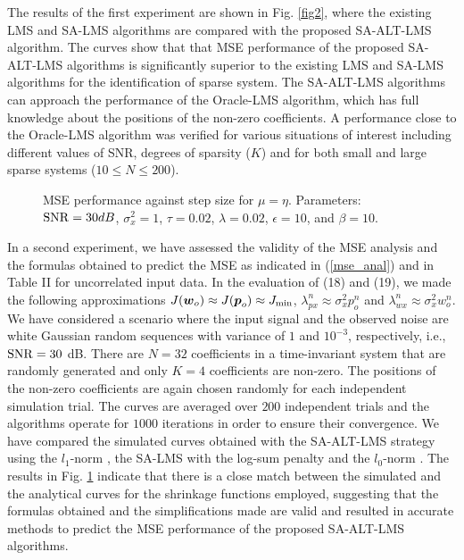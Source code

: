 \documentclass[10pt,onecolumn]{IEEEtran}
\begin{document}
The results of the first experiment are shown in Fig. \ref{fig2},
where the existing LMS and SA-LMS algorithms are compared with the
proposed SA-ALT-LMS algorithm. The curves show that that MSE
performance of the proposed SA-ALT-LMS algorithms is significantly
superior to the existing LMS and SA-LMS algorithms for the
identification of sparse system. The SA-ALT-LMS algorithms can
approach the performance of the Oracle-LMS algorithm, which has full
knowledge about the positions of the non-zero coefficients. A
performance close to the Oracle-LMS algorithm was verified for
various situations of interest including different values of SNR,
degrees of sparsity ($K$) and for both small and large sparse
systems ($10 \leq N \leq 200$).

\begin{figure}[!htb]
\begin{center}
\def\epsfsize#1#2{0.875\columnwidth}
 \vspace{-1.35em}\caption{MSE performance against
step size for $\mu=\eta$. Parameters: ${\rm SNR}=30 dB$,
$\sigma_x^2=1$, $\tau = 0.02$, $\lambda=0.02$, $\epsilon = 10$, and
$\beta = 10$. }\label{fig3}
\end{center}
\end{figure}

In a second experiment, we have assessed the validity of the MSE
analysis and the formulas obtained to predict the MSE as indicated
in (\ref{mse_anal}) and in Table II for uncorrelated input data. In
the evaluation of (18) and (19), we made the following
approximations $J({\boldsymbol w}_o) \approx J({\boldsymbol p}_o)
\approx J_{\rm min}$, $\lambda_{px}^n \approx \sigma_x^2 p_o^n$ and
$\lambda_{wx}^n \approx \sigma_x^2 w_o^n$. We have considered a
scenario where the input signal and the observed noise are white
Gaussian random sequences with variance of $1$ and $10^{-3}$,
respectively, i.e., ${\rm SNR} = 30$ dB. There are $N=32$
coefficients in a time-invariant system that are randomly generated
and only $K=4$ coefficients are non-zero. The positions of the
non-zero coefficients are again chosen randomly for each independent
simulation trial. The curves are averaged over $200$ independent
trials and the algorithms operate for $1000$ iterations in order to
ensure their convergence. We have compared the simulated curves
obtained with the SA-ALT-LMS strategy using the $l_1$-norm
\cite{chen}, {the SA-LMS with the log-sum penalty
\cite{chen,eksioglu,candes} and the $l_0$-norm \cite{gu,eksioglu2}.}
The results in Fig. \ref{fig3} indicate that there is a close match
between the simulated and the analytical curves for the shrinkage
functions employed, suggesting that the formulas obtained and the
simplifications made are valid and resulted in accurate methods to
predict the MSE performance of the proposed SA-ALT-LMS algorithms.
\end{document}

